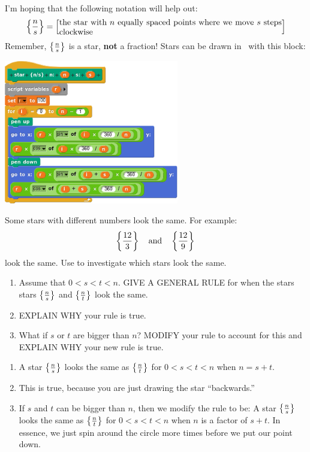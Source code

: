 \documentclass[noauthor,nooutcomes,12pt,hints,handout]{ximera}
\begin{document}
I'm hoping that the following notation will help out:
\[
\stringstar{n}{s}=\left[\begin{minipage}{3.7in}
the star with $n$ equally spaced points where we move $s$ steps clockwise
\end{minipage}\right]
\]
Remember, $\left\{\frac{n}{s}\right\}$ is a star, \textbf{not} a fraction!
Stars can be drawn in \snap\ with this block:
\begin{center}
  \includegraphics[width=3in]{starBlockScript.png}
\end{center}





\mynewpage






\begin{question}
  Some stars with different numbers look the same. For example:
  \[
  \left\{\frac{12}{3}\right\}\quad\text{and}\quad\left\{\frac{12}{9}\right\}
  \]
look the same.  Use
 to investigate
which stars look the same.
\begin{enumerate}
  \item Assume that $0 < s < t< n$.  GIVE A GENERAL RULE for when the
    stars stars $\left\{\frac{n}{s}\right\}$ and $\left\{\frac{n}{t}\right\}$ look the
    same.
  \item EXPLAIN WHY your rule is true.
  \item What if $s$ or $t$ are bigger than $n$? MODIFY your rule to
    account for this and EXPLAIN WHY your new rule is true.
\end{enumerate}
\begin{freeResponse}
  \begin{enumerate}
  \item A star $\left\{\frac{n}{s}\right\}$ looks the same as $\left\{\frac{n}{t}\right\}$ for
    $0 < s < t< n$ when $n=s+ t$.
  \item This is true, because you are just drawing the star ``backwards.''
  \item If $s$ and $t$ can be bigger than $n$, then we modify the
    rule to be: A star $\left\{\frac{n}{s}\right\}$ looks the same as
    $\left\{\frac{n}{t}\right\}$ for $0 < s < t< n$ when $n$ is a factor of
    $s+t$. In essence, we just spin around the circle more times
    before we put our point down.
  \end{enumerate}
\end{freeResponse}
\end{question}
\mynewpage
\end{document}
